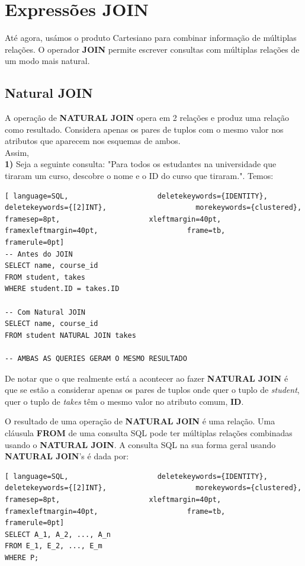 \documentclass[titlepage]{book}
\theoremstyle{definition}
\begin{document}
\section{Expressões JOIN}
Até agora, usámos o produto Cartesiano para combinar informação de múltiplas relações. O operador \textbf{JOIN} permite escrever consultas com múltiplas relações de um modo mais natural.

\subsection{Natural JOIN} 
A operação de \textbf{NATURAL JOIN} opera em 2 relações e produz uma relação como resultado. Considera apenas os pares de tuplos com o mesmo valor nos atributos que aparecem nos esquemas de ambos. \\
Assim, \\
\textbf{1)} Seja a seguinte consulta: "Para todos os estudantes na universidade que tiraram um curso, descobre o nome e o ID do curso que tiraram.". Temos:
\begin{lstlisting}[ language=SQL,                     deletekeywords={IDENTITY},                     deletekeywords={[2]INT},                     morekeywords={clustered},                     framesep=8pt,                     xleftmargin=40pt,                     framexleftmargin=40pt,                     frame=tb,                     framerule=0pt]
-- Antes do JOIN
SELECT name, course_id
FROM student, takes
WHERE student.ID = takes.ID

-- Com Natural JOIN
SELECT name, course_id
FROM student NATURAL JOIN takes

-- AMBAS AS QUERIES GERAM O MESMO RESULTADO
\end{lstlisting}

De notar que o que realmente está a acontecer ao fazer \textbf{NATURAL JOIN} é que se estão a considerar apenas os pares de tuplos onde quer o tuplo de \textit{student}, quer o tuplo de \textit{takes} têm o mesmo valor no atributo comum, \textbf{ID}.

O resultado de uma operação de \textbf{NATURAL JOIN} é uma relação. Uma cláusula \textbf{FROM} de uma consulta SQL pode ter múltiplas relações combinadas usando o \textbf{NATURAL JOIN}. A consulta SQL na sua forma geral usando \textbf{NATURAL JOIN}'s é dada por:
\begin{lstlisting}[ language=SQL,                     deletekeywords={IDENTITY},                     deletekeywords={[2]INT},                     morekeywords={clustered},                     framesep=8pt,                     xleftmargin=40pt,                     framexleftmargin=40pt,                     frame=tb,                     framerule=0pt]
SELECT A_1, A_2, ..., A_n
FROM E_1, E_2, ..., E_m
WHERE P;
\end{lstlisting}
\end{document}
